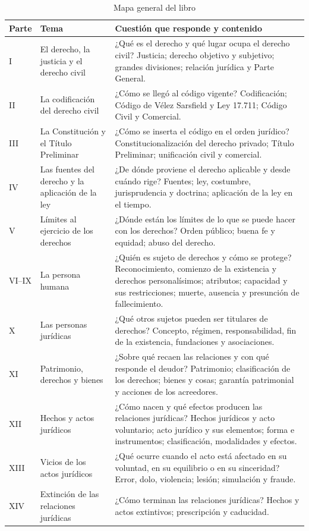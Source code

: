 \documentclass[12pt,oneside]{book}
\begin{document}
\begin{table}[H]
\centering
\small
\renewcommand{\arraystretch}{1.25}
\begin{tabularx}{\textwidth}{>{\raggedright\arraybackslash}p{} >{\raggedright\arraybackslash}p{} >{\raggedright\arraybackslash}X}
\toprule
\textbf{Parte} & \textbf{Tema} & \textbf{Cuestión que responde y contenido} \\
\midrule
I & El derecho, la justicia y el derecho civil & ¿Qué es el derecho y qué lugar ocupa el derecho civil? Justicia; derecho objetivo y subjetivo; grandes divisiones; relación jurídica y Parte General. \\
II & La codificación del derecho civil & ¿Cómo se llegó al código vigente? Codificación; Código de Vélez Sarsfield y Ley 17.711; Código Civil y Comercial. \\
III & La Constitución y el Título Preliminar & ¿Cómo se inserta el código en el orden jurídico? Constitucionalización del derecho privado; Título Preliminar; unificación civil y comercial. \\
IV & Las fuentes del derecho y la aplicación de la ley & ¿De dónde proviene el derecho aplicable y desde cuándo rige? Fuentes; ley, costumbre, jurisprudencia y doctrina; aplicación de la ley en el tiempo. \\
V & Límites al ejercicio de los derechos & ¿Dónde están los límites de lo que se puede hacer con los derechos? Orden público; buena fe y equidad; abuso del derecho. \\
VI--IX & La persona humana & ¿Quién es sujeto de derechos y cómo se protege? Reconocimiento, comienzo de la existencia y derechos personalísimos; atributos; capacidad y sus restricciones; muerte, ausencia y presunción de fallecimiento. \\
X & Las personas jurídicas & ¿Qué otros sujetos pueden ser titulares de derechos? Concepto, régimen, responsabilidad, fin de la existencia, fundaciones y asociaciones. \\
XI & Patrimonio, derechos y bienes & ¿Sobre qué recaen las relaciones y con qué responde el deudor? Patrimonio; clasificación de los derechos; bienes y cosas; garantía patrimonial y acciones de los acreedores. \\
XII & Hechos y actos jurídicos & ¿Cómo nacen y qué efectos producen las relaciones jurídicas? Hechos jurídicos y acto voluntario; acto jurídico y sus elementos; forma e instrumentos; clasificación, modalidades y efectos. \\
XIII & Vicios de los actos jurídicos & ¿Qué ocurre cuando el acto está afectado en su voluntad, en su equilibrio o en su sinceridad? Error, dolo, violencia; lesión; simulación y fraude. \\
XIV & Extinción de las relaciones jurídicas & ¿Cómo terminan las relaciones jurídicas? Hechos y actos extintivos; prescripción y caducidad. \\
\bottomrule
\end{tabularx}
\caption{Mapa general del libro}
\end{table}
\end{document}
